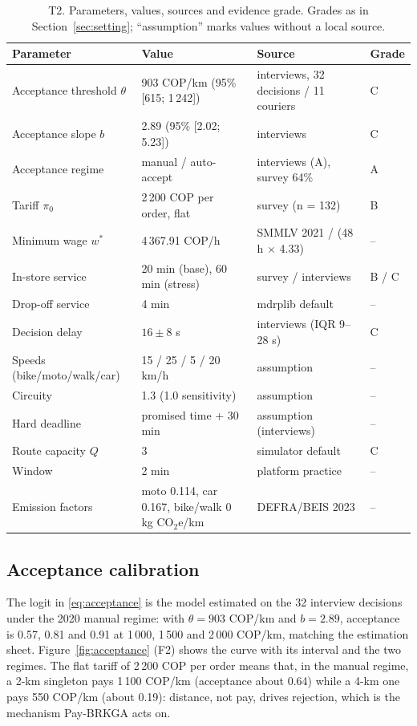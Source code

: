 \documentclass[preprint,12pt,authoryear]{elsarticle}%
\begin{document}
\begin{table}[ht]
\centering\small
\caption{T2. Parameters, values, sources and evidence grade. Grades as in Section~\ref{sec:setting}; ``assumption'' marks values without a local source.}
\label{tab:parameters}
\begin{tabular}{llll}
\toprule
Parameter & Value & Source & Grade \\
\midrule
Acceptance threshold $\theta$ & 903 COP/km (95\% [615; 1\,242]) & interviews, 32 decisions / 11 couriers & C \\
Acceptance slope $b$ & 2.89 (95\% [2.02; 5.23]) & interviews & C \\
Acceptance regime & manual / auto-accept & interviews (A), survey 64\% & A \\
Tariff $\pi_0$ & 2\,200 COP per order, flat & survey (n = 132) & B \\
Minimum wage $w^*$ & 4\,367.91 COP/h & SMMLV 2021 / (48 h $\times$ 4.33) & -- \\
In-store service & 20 min (base), 60 min (stress) & survey / interviews & B / C \\
Drop-off service & 4 min & mdrplib default & -- \\
Decision delay & $16 \pm 8$ s & interviews (IQR 9--28 s) & C \\
Speeds (bike/moto/walk/car) & 15 / 25 / 5 / 20 km/h & assumption & -- \\
Circuity & 1.3 (1.0 sensitivity) & assumption & -- \\
Hard deadline & promised time + 30 min & assumption (interviews) & -- \\
Route capacity $Q$ & 3 & simulator default & C \\
Window & 2 min & platform practice & -- \\
Emission factors & moto 0.114, car 0.167, bike/walk 0 kg CO$_2$e/km & DEFRA/BEIS 2023 \citep{defra2023factors} & -- \\
\bottomrule
\end{tabular}
\end{table}

\subsection{Acceptance calibration}

The logit in \eqref{eq:acceptance} is the model estimated on the 32 interview decisions under the 2020 manual regime: with $\theta = 903$ COP/km and $b = 2.89$, acceptance is 0.57, 0.81 and 0.91 at 1\,000, 1\,500 and 2\,000 COP/km, matching the estimation sheet. Figure~\ref{fig:acceptance} (F2) shows the curve with its interval and the two regimes. The flat tariff of 2\,200 COP per order means that, in the manual regime, a 2-km singleton pays 1\,100 COP/km (acceptance about 0.64) while a 4-km one pays 550 COP/km (about 0.19): distance, not pay, drives rejection, which is the mechanism Pay-BRKGA acts on.
\end{document}

